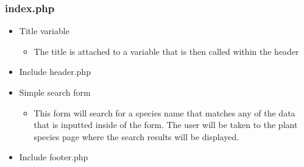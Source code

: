     \subsubsection{index.php}
        \begin{itemize}
            \item Title variable
            \begin{itemize}
                \item The title is attached to a variable that is then called within the header
            \end{itemize}
            \item Include header.php
            \item Simple search form
            \begin{itemize}
                \item This form will search for a species name that matches any of the data that is inputted inside of the form. The user will be taken to the plant species page where the search results will be displayed.
            \end{itemize}
            \item Include footer.php
        \end{itemize}
    
        
